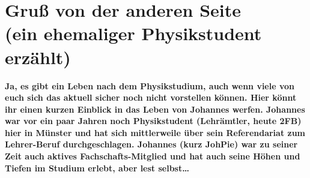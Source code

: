 \section[Gruß von der anderen Seite (ein ehemaliger Physikstudent erzählt)]{Gruß von der anderen Seite\\(ein ehemaliger Physikstudent erzählt)}
\textbf{Ja, es gibt ein Leben nach dem Physikstudium, auch wenn viele von euch sich das aktuell sicher noch nicht vorstellen können.
Hier könnt ihr einen kurzen Einblick in das Leben von Johannes werfen.
Johannes war vor ein paar Jahren noch Physikstudent (Lehrämtler, heute 2FB) hier in Münster und hat sich mittlerweile über sein Referendariat zum Lehrer-Beruf durchgeschlagen.
Johannes (kurz JohPie) war zu seiner Zeit auch aktives Fachschafts-Mitglied und hat auch seine Höhen und Tiefen im Studium erlebt, aber lest selbst\dots}

